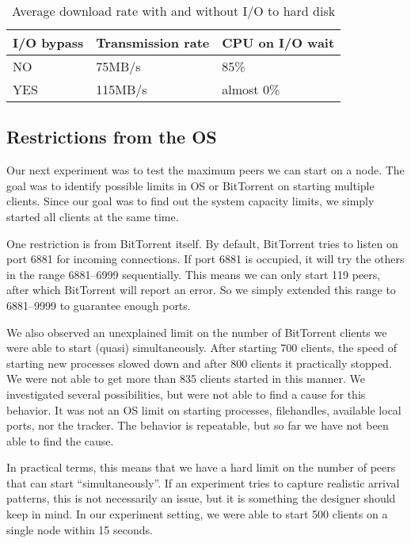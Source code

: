\documentclass[10pt,letterpaper,twocolumn]{article}
\begin{document}
\begin{table}[!tb]
\centering
\begin{tabular}{|p{1.8cm}|p{2.5cm}|p{2.5cm}|}
\hline
I/O bypass &  Transmission rate & CPU on I/O wait \\
\hline
NO & 75MB/s & 85\% \\
\hline
YES & 115MB/s & almost 0\% \\
\hline
\end{tabular}
\caption{Average download rate with and without I/O to hard disk}
\label{tab:table_diskio}
\end{table}


\subsection{Restrictions from the OS}

Our next experiment was to test the maximum peers we can start on a
node. The goal was to identify possible limits in OS or BitTorrent on
starting multiple clients. Since our goal was to find out the system
capacity limits, we simply started all clients at the same time.



One restriction is from BitTorrent itself. By default, BitTorrent
tries to listen on port 6881 for incoming connections. If port 6881 is
occupied, it will try the others in the range 6881--6999
sequentially. This means we can only start 119 peers, after which
BitTorrent will report an error. So we simply extended this range to
6881--9999 to guarantee enough ports.

We also observed an unexplained limit on the number of BitTorrent
clients we were able to start (quasi) simultaneously. After starting
700 clients, the speed of starting new processes slowed down and after
800 clients it practically stopped. We were not able to get more than
835 clients started in this manner. We investigated several
possibilities, but were not able to find a cause for this behavior. It
was not an OS limit on starting processes, filehandles, available
local ports, nor the tracker. The behavior is repeatable, but so far
we have not been able to find the cause.









In practical terms, this means that we have a hard limit on the number
of peers that can start ``simultaneously''. If an experiment tries to
capture realistic arrival patterns, this is not necessarily an issue,
but it is something the designer should keep in mind. In our
experiment setting, we were able to start 500 clients on a single node
within 15 seconds.
\end{document}
